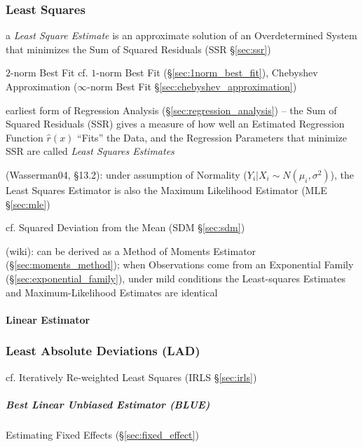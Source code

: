 \subsubsection{Least Squares}\label{sec:least_squares}

a \emph{Least Square Estimate} is an approximate solution of an Overdetermined
System that minimizes the Sum of Squared Residuals (SSR \S\ref{sec:ssr})

$2$-norm Best Fit \fist cf. $1$-norm Best Fit (\S\ref{sec:1norm_best_fit}),
Chebyshev Approximation ($\infty$-norm Best Fit
\S\ref{sec:chebyshev_approximation})

earliest form of Regression Analysis (\S\ref{sec:regression_analysis})
-- the Sum of Squared Residuals (SSR) gives a measure of how well
an Estimated Regression Function $\hat{r}(x)$ ``Fits'' the Data, and the
Regression Parameters that minimize SSR are called \emph{Least Squares
  Estimates}

(Wasserman04, \S13.2):
 under assumption of Normality ($Y_i | X_i \sim N(\mu_i, \sigma^2)$), the Least
 Squares Estimator is also the Maximum Likelihood Estimator (MLE
 \S\ref{sec:mle})

cf. Squared Deviation from the Mean (SDM \S\ref{sec:sdm})

(wiki): can be derived as a Method of Moments Estimator
(\S\ref{sec:moments_method});
when Observations come from an Exponential Family
(\S\ref{sec:exponential_family}), under mild conditions the Least-squares
Estimates and Maximum-Likelihood Estimates are identical



\paragraph{Linear Estimator}\label{sec:linear_estimator}\hfill




\subsubsection{Least Absolute Deviations (LAD)}\label{sec:lad}

cf. Iteratively Re-weighted Least Squares (IRLS \S\ref{sec:irls})



\subparagraph{Best Linear Unbiased Estimator (BLUE)}\label{sec:blue}\hfill

Estimating Fixed Effects (\S\ref{sec:fixed_effect})

